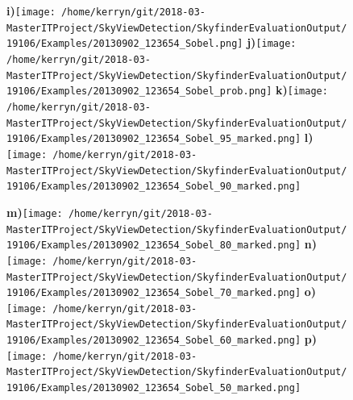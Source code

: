 \documentclass{article}
\begin{document}
\begin{figure}
\textbf{\scriptsize{i)}}\texttt{[image: /home/kerryn/git/2018-03-MasterITProject/SkyViewDetection/SkyfinderEvaluationOutput/19106/Examples/20130902\_123654\_Sobel.png]} \hfill%
\textbf{\scriptsize{j)}}\texttt{[image: /home/kerryn/git/2018-03-MasterITProject/SkyViewDetection/SkyfinderEvaluationOutput/19106/Examples/20130902\_123654\_Sobel\_prob.png]} \hfill%
\textbf{\scriptsize{k)}}\texttt{[image: /home/kerryn/git/2018-03-MasterITProject/SkyViewDetection/SkyfinderEvaluationOutput/19106/Examples/20130902\_123654\_Sobel\_95\_marked.png]} \hfill%
\textbf{\scriptsize{l)}}\texttt{[image: /home/kerryn/git/2018-03-MasterITProject/SkyViewDetection/SkyfinderEvaluationOutput/19106/Examples/20130902\_123654\_Sobel\_90\_marked.png]} 

\textbf{\scriptsize{m)}}\texttt{[image: /home/kerryn/git/2018-03-MasterITProject/SkyViewDetection/SkyfinderEvaluationOutput/19106/Examples/20130902\_123654\_Sobel\_80\_marked.png]} \hfill%
\textbf{\scriptsize{n)}}\texttt{[image: /home/kerryn/git/2018-03-MasterITProject/SkyViewDetection/SkyfinderEvaluationOutput/19106/Examples/20130902\_123654\_Sobel\_70\_marked.png]} \hfill%
\textbf{\scriptsize{o)}}\texttt{[image: /home/kerryn/git/2018-03-MasterITProject/SkyViewDetection/SkyfinderEvaluationOutput/19106/Examples/20130902\_123654\_Sobel\_60\_marked.png]} \hfill%
\textbf{\scriptsize{p)}}\texttt{[image: /home/kerryn/git/2018-03-MasterITProject/SkyViewDetection/SkyfinderEvaluationOutput/19106/Examples/20130902\_123654\_Sobel\_50\_marked.png]} 

\end{figure} 

\clearpage
\end{document}
